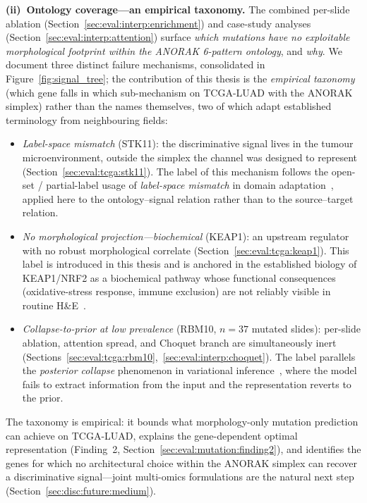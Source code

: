 \textbf{(ii)~Ontology coverage---an empirical taxonomy.}
The combined per-slide ablation
(Section~\ref{sec:eval:interp:enrichment}) and case-study analyses
(Section~\ref{sec:eval:interp:attention}) surface \emph{which mutations have no
exploitable morphological footprint within the ANORAK 6-pattern
ontology}, and \emph{why}.
We document three distinct failure mechanisms, consolidated in
Figure~\ref{fig:signal_tree}; the contribution of this thesis is
the \emph{empirical taxonomy} (which gene falls in which
sub-mechanism on TCGA-LUAD with the ANORAK simplex) rather than
the names themselves, two of which adapt established terminology
from neighbouring fields:
\begin{itemize}
  \item \emph{Label-space mismatch} (STK11): the discriminative
  signal lives in the tumour microenvironment, outside the simplex
  the channel was designed to represent
  (Section~\ref{sec:eval:tcga:stk11}).
  The label of this mechanism follows the open-set / partial-label
  usage of \emph{label-space mismatch} in domain
  adaptation~\cite{lipton2018labelshift}, applied here to the
  ontology--signal relation rather than to the source--target
  relation.
  \item \emph{No morphological projection---biochemical} (KEAP1):
  an upstream regulator with no robust morphological correlate
  (Section~\ref{sec:eval:tcga:keap1}).
  This label is introduced in this thesis and is anchored in the
  established biology of KEAP1/NRF2 as a biochemical pathway whose
  functional consequences (oxidative-stress response, immune
  exclusion) are not reliably visible in routine
  H\&E~\cite{li2011keap1papillary,tcga2014luad}.
  \item \emph{Collapse-to-prior at low prevalence}
  (RBM10, $n = 37$ mutated slides): per-slide ablation, attention
  spread, and Choquet branch are simultaneously inert
  (Sections~\ref{sec:eval:tcga:rbm10},~\ref{sec:eval:interp:choquet}).
  The label parallels the \emph{posterior collapse} phenomenon in
  variational inference~\cite{bowman2016posteriorcollapse}, where
  the model fails to extract information from the input and the
  representation reverts to the prior.
\end{itemize}
The taxonomy is empirical: it bounds what morphology-only mutation
prediction can achieve on TCGA-LUAD, explains the gene-dependent
optimal representation
(Finding~2, Section~\ref{sec:eval:mutation:finding2}), and
identifies the genes for which no architectural choice within the
ANORAK simplex can recover a discriminative signal---joint
multi-omics formulations are the natural next step
(Section~\ref{sec:disc:future:medium}).


